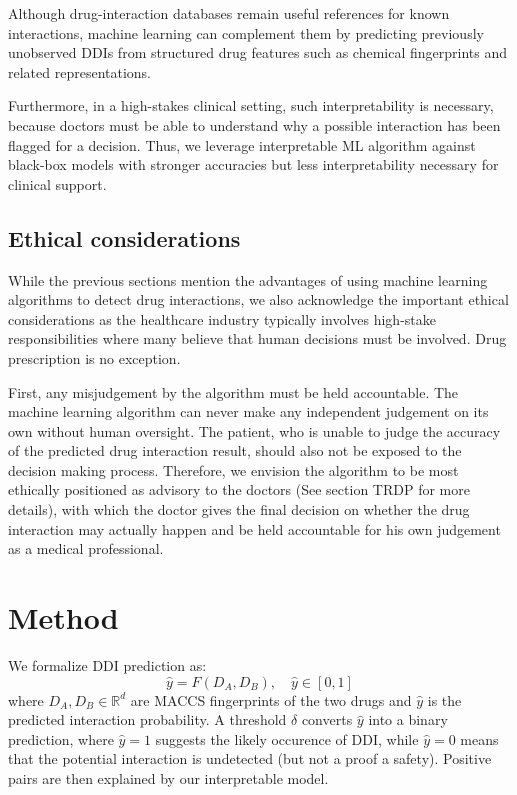 \documentclass[letterpaper]{article} %
\begin{document}
Although drug-interaction databases remain useful references for known interactions, machine learning can complement them by predicting previously unobserved DDIs from structured drug features such as chemical fingerprints and related representations. 

Furthermore, in a high-stakes clinical setting, such interpretability is necessary, because doctors must be able to understand why a possible interaction has been flagged for a decision. Thus, we leverage interpretable ML algorithm against black-box models with stronger accuracies but less interpretability necessary for clinical support.



\subsection{Ethical considerations}

While the previous sections mention the advantages of using machine learning algorithms to detect drug interactions, we also acknowledge the important ethical considerations as the healthcare industry typically involves high-stake responsibilities where many believe that human decisions must be involved. Drug prescription is no exception. 

First, any misjudgement by the algorithm must be held accountable. The machine learning algorithm can never make any independent judgement on its own without human oversight. The patient, who is unable to judge the accuracy of the predicted drug interaction result, should also not be exposed to the decision making process. Therefore, we envision the algorithm to be most ethically positioned as advisory to the doctors (See section TRDP for more details), with which the doctor gives the final decision on whether the drug interaction may actually happen and be held accountable for his own judgement as a medical professional.

\section{Method}

We formalize DDI prediction as:
\begin{equation}
    \hat{y} = F(D_A, D_B), \quad \hat{y} \in [0, 1]
\end{equation}
where $D_A, D_B \in \mathbb{R}^{d}$ are MACCS fingerprints of the two drugs and $\hat{y}$ is the predicted interaction probability. A threshold $\delta$ converts $\hat{y}$ into a binary prediction, where $\hat{y} = 1$ suggests the likely occurence of DDI, while $\hat{y} = 0$ means that the potential interaction is undetected (but not a proof a safety). Positive pairs are then explained by our interpretable model.
\end{document}
